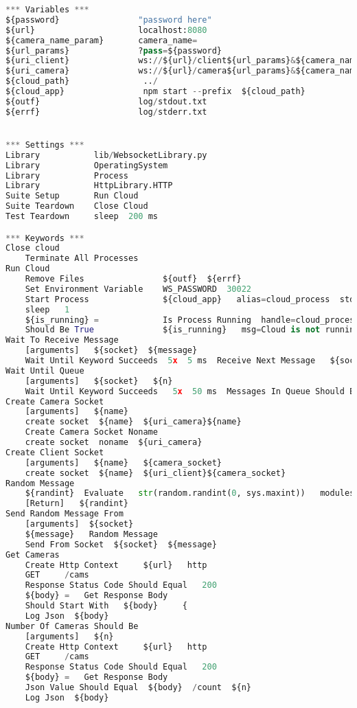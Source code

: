 \documentclass[hidelinks,11pt,a4paper,oneside,article]{memoir}
\begin{document}
\begin{lstlisting}[label={listing:robottest},caption={RobotFramework test file},language=Python, style=styleprogramming]
*** Variables ***
${password}                "password here"
${url}                     localhost:8080
${camera_name_param}       camera_name=
${url_params}              ?pass=${password}
${uri_client}              ws://${url}/client${url_params}&${camera_name_param}
${uri_camera}              ws://${url}/camera${url_params}&${camera_name_param}
${cloud_path}               ../
${cloud_app}                npm start --prefix  ${cloud_path}
${outf}                    log/stdout.txt
${errf}                    log/stderr.txt


*** Settings ***
Library           lib/WebsocketLibrary.py
Library           OperatingSystem
Library           Process
Library           HttpLibrary.HTTP
Suite Setup       Run Cloud
Suite Teardown    Close Cloud
Test Teardown     sleep  200 ms

*** Keywords ***
Close cloud
    Terminate All Processes
Run Cloud
    Remove Files                ${outf}  ${errf}
    Set Environment Variable    WS_PASSWORD  30022
    Start Process               ${cloud_app}   alias=cloud_process  stdout=${outf}  stderr=${errf}  shell=True
    sleep   1
    ${is_running} =             Is Process Running  handle=cloud_process
    Should Be True              ${is_running}   msg=Cloud is not running
Wait To Receive Message
    [arguments]   ${socket}  ${message}
    Wait Until Keyword Succeeds  5x  5 ms  Receive Next Message   ${socket}  ${message}
Wait Until Queue
    [arguments]   ${socket}   ${n}
    Wait Until Keyword Succeeds   5x  50 ms  Messages In Queue Should Be   ${socket}   ${n}
Create Camera Socket
    [arguments]   ${name}
    create socket  ${name}  ${uri_camera}${name}
    Create Camera Socket Noname
    create socket  noname  ${uri_camera}
Create Client Socket
    [arguments]   ${name}   ${camera_socket}
    create socket  ${name}  ${uri_client}${camera_socket}
Random Message
    ${randint}  Evaluate   str(random.randint(0, sys.maxint))   modules=random, sys
    [Return]   ${randint}
Send Random Message From
    [arguments]  ${socket}
    ${message}   Random Message
    Send From Socket  ${socket}  ${message}
Get Cameras
    Create Http Context 	${url}   http
    GET 	/cams
    Response Status Code Should Equal 	200
    ${body} = 	Get Response Body 	
    Should Start With 	${body} 	{
    Log Json  ${body}
Number Of Cameras Should Be
    [arguments]   ${n}
    Create Http Context 	${url}   http
    GET 	/cams
    Response Status Code Should Equal 	200
    ${body} = 	Get Response Body 	
    Json Value Should Equal  ${body}  /count  ${n}
    Log Json  ${body}
    

\end{lstlisting}
\end{document}
